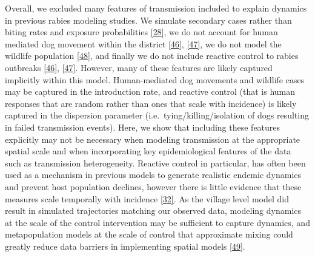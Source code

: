 \documentclass[
  oneside]{book}
\begin{document}
Overall, we excluded many features of transmission included to explain dynamics in previous rabies modeling studies. We simulate secondary cases rather than biting rates and exposure probabilities \protect\hyperlink{ref-Mancyinprep}{{[}28{]}}, we do not account for human mediated dog movement within the district \protect\hyperlink{ref-ferguson2015}{{[}46{]}}, \protect\hyperlink{ref-townsend2013}{{[}47{]}}, we do not model the wildlife population \protect\hyperlink{ref-fitzpatrick2012}{{[}48{]}}, and finally we do not include reactive control to rabies outbreaks \protect\hyperlink{ref-ferguson2015}{{[}46{]}}, \protect\hyperlink{ref-townsend2013}{{[}47{]}}. However, many of these features are likely captured implicitly within this model. Human-mediated dog movements and wildlife cases may be captured in the introduction rate, and reactive control (that is human responses that are random rather than ones that scale with incidence) is likely captured in the dispersion parameter (i.e.~tying/killing/isolation of dogs resulting in failed transmission events). Here, we show that including these features explicitly may not be necessary when modeling transmission at the appropriate spatial scale and when incorporating key epidemiological features of the data such as transmission heterogeneity. Reactive control in particular, has often been used as a mechanism in previous models to generate realistic endemic dynamics and prevent host population declines, however there is little evidence that these measures scale temporally with incidence \protect\hyperlink{ref-Hampson2009}{{[}32{]}}. As the village level model did result in simulated trajectories matching our observed data, modeling dynamics at the scale of the control intervention may be sufficient to capture dynamics, and metapopulation models at the scale of control that approximate mixing could greatly reduce data barriers in implementing spatial models \protect\hyperlink{ref-pascual2011}{{[}49{]}}.
\end{document}

